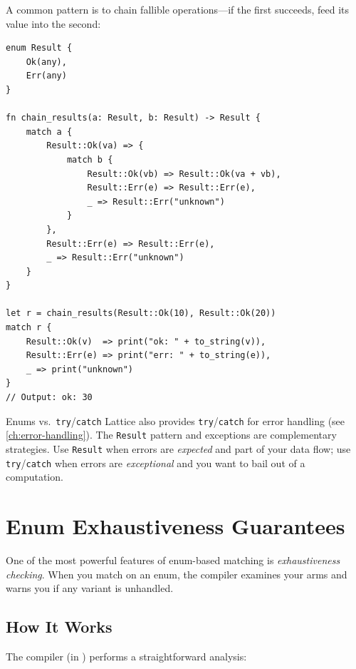 A common pattern is to chain fallible operations---if the first succeeds,
feed its value into the second:

\begin{lstlisting}[language=Lattice, caption={Chaining two results}]
enum Result {
    Ok(any),
    Err(any)
}

fn chain_results(a: Result, b: Result) -> Result {
    match a {
        Result::Ok(va) => {
            match b {
                Result::Ok(vb) => Result::Ok(va + vb),
                Result::Err(e) => Result::Err(e),
                _ => Result::Err("unknown")
            }
        },
        Result::Err(e) => Result::Err(e),
        _ => Result::Err("unknown")
    }
}

let r = chain_results(Result::Ok(10), Result::Ok(20))
match r {
    Result::Ok(v)  => print("ok: " + to_string(v)),
    Result::Err(e) => print("err: " + to_string(e)),
    _ => print("unknown")
}
// Output: ok: 30
\end{lstlisting}

\begin{notebox}{Enums vs.\ \texttt{try}/\texttt{catch}}
Lattice also provides \lstinline|try|/\lstinline|catch| for error handling
(see \cref{ch:error-handling}). The \lstinline|Result| pattern and
exceptions are complementary strategies. Use \lstinline|Result| when errors
are \emph{expected} and part of your data flow; use
\lstinline|try|/\lstinline|catch| when errors are \emph{exceptional} and you
want to bail out of a computation.
\end{notebox}

\section{Enum Exhaustiveness Guarantees}\label{sec:enum-exhaustiveness}

One of the most powerful features of enum-based matching is
\emph{exhaustiveness checking}. When you match on an enum, the compiler
examines your arms and warns you if any variant is unhandled.

\subsection{How It Works}

The compiler (in ) performs a straightforward
analysis:

